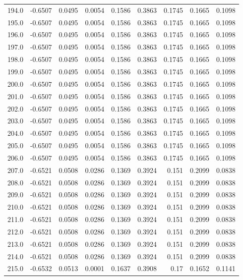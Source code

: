 \begin{longtable}{lrrrrrrrr}
194.0 & -0.6507 & 0.0495 & 0.0054 & 0.1586 & 0.3863 & 0.1745 & 0.1665 & 0.1098 \\
195.0 & -0.6507 & 0.0495 & 0.0054 & 0.1586 & 0.3863 & 0.1745 & 0.1665 & 0.1098 \\
196.0 & -0.6507 & 0.0495 & 0.0054 & 0.1586 & 0.3863 & 0.1745 & 0.1665 & 0.1098 \\
197.0 & -0.6507 & 0.0495 & 0.0054 & 0.1586 & 0.3863 & 0.1745 & 0.1665 & 0.1098 \\
198.0 & -0.6507 & 0.0495 & 0.0054 & 0.1586 & 0.3863 & 0.1745 & 0.1665 & 0.1098 \\
199.0 & -0.6507 & 0.0495 & 0.0054 & 0.1586 & 0.3863 & 0.1745 & 0.1665 & 0.1098 \\
200.0 & -0.6507 & 0.0495 & 0.0054 & 0.1586 & 0.3863 & 0.1745 & 0.1665 & 0.1098 \\
201.0 & -0.6507 & 0.0495 & 0.0054 & 0.1586 & 0.3863 & 0.1745 & 0.1665 & 0.1098 \\
202.0 & -0.6507 & 0.0495 & 0.0054 & 0.1586 & 0.3863 & 0.1745 & 0.1665 & 0.1098 \\
203.0 & -0.6507 & 0.0495 & 0.0054 & 0.1586 & 0.3863 & 0.1745 & 0.1665 & 0.1098 \\
204.0 & -0.6507 & 0.0495 & 0.0054 & 0.1586 & 0.3863 & 0.1745 & 0.1665 & 0.1098 \\
205.0 & -0.6507 & 0.0495 & 0.0054 & 0.1586 & 0.3863 & 0.1745 & 0.1665 & 0.1098 \\
206.0 & -0.6507 & 0.0495 & 0.0054 & 0.1586 & 0.3863 & 0.1745 & 0.1665 & 0.1098 \\
207.0 & -0.6521 & 0.0508 & 0.0286 & 0.1369 & 0.3924 & 0.151 & 0.2099 & 0.0838 \\
208.0 & -0.6521 & 0.0508 & 0.0286 & 0.1369 & 0.3924 & 0.151 & 0.2099 & 0.0838 \\
209.0 & -0.6521 & 0.0508 & 0.0286 & 0.1369 & 0.3924 & 0.151 & 0.2099 & 0.0838 \\
210.0 & -0.6521 & 0.0508 & 0.0286 & 0.1369 & 0.3924 & 0.151 & 0.2099 & 0.0838 \\
211.0 & -0.6521 & 0.0508 & 0.0286 & 0.1369 & 0.3924 & 0.151 & 0.2099 & 0.0838 \\
212.0 & -0.6521 & 0.0508 & 0.0286 & 0.1369 & 0.3924 & 0.151 & 0.2099 & 0.0838 \\
213.0 & -0.6521 & 0.0508 & 0.0286 & 0.1369 & 0.3924 & 0.151 & 0.2099 & 0.0838 \\
214.0 & -0.6521 & 0.0508 & 0.0286 & 0.1369 & 0.3924 & 0.151 & 0.2099 & 0.0838 \\
215.0 & -0.6532 & 0.0513 & 0.0001 & 0.1637 & 0.3908 & 0.17 & 0.1652 & 0.1141 \\

\end{longtable}
